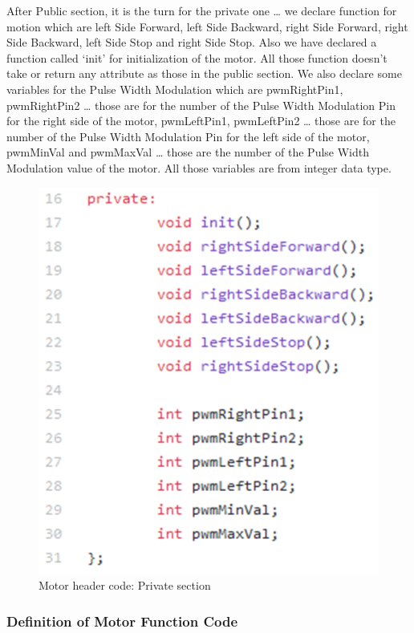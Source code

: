 \newpage
After Public section, it is the turn for the private one … we declare function for motion which are left Side Forward, left Side Backward, right Side Forward, right Side Backward, left Side Stop and right Side Stop. Also we have declared a function called ‘init’ for initialization of the motor.  All those function doesn’t take or return any attribute as those in the public section. We also declare some variables for the Pulse Width Modulation which are pwmRightPin1, pwmRightPin2 … those are for the number of the Pulse Width Modulation Pin for the right side of the motor, pwmLeftPin1, pwmLeftPin2 … those are for the number of the Pulse Width Modulation Pin for the left side of the motor, pwmMinVal and pwmMaxVal … those are the number of the Pulse Width Modulation value of the motor. All those variables are from integer data type.

\begin{figure}[h]
    \centering
    \includegraphics[width=.7\textwidth]{figures/52.png}
    \caption{Motor header code: Private section}
    \label{fig:my_label}
\end{figure}

\newpage

\subsubsection{Definition of Motor Function Code}

